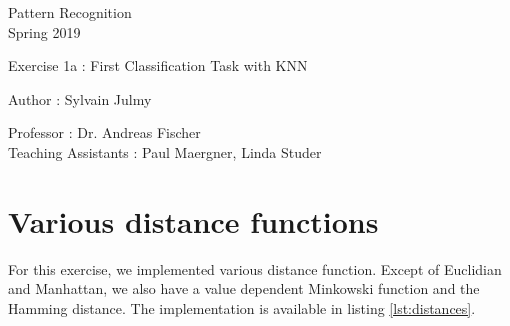 \documentclass[a4paper,11pt]{report}
\date{\today}
\begin{document}
\begin{center}
\Large{
    Pattern Recognition \\
    Spring 2019
  }
  
  \noindent\makebox[\linewidth]{\rule{\linewidth}{0.4pt}}
  Exercise 1a : First Classification Task with KNN

  \vspace*{1.4cm}

  Author : Sylvain Julmy
  \noindent\makebox[\linewidth]{\rule{\linewidth}{0.4pt}}

  \begin{flushleft}
    Professor : Dr. Andreas Fischer \\
    Teaching Assistants : Paul Maergner, Linda Studer
  \end{flushleft}

  \noindent\makebox[\linewidth]{\rule{\textwidth}{1pt}}
\end{center}

\section*{Various distance functions}
For this exercise, we implemented various distance function. Except of
Euclidian and Manhattan, we also have a value dependent Minkowski function and
the Hamming distance. The implementation is available in listing
\ref{lst:distances}.
\end{document}
